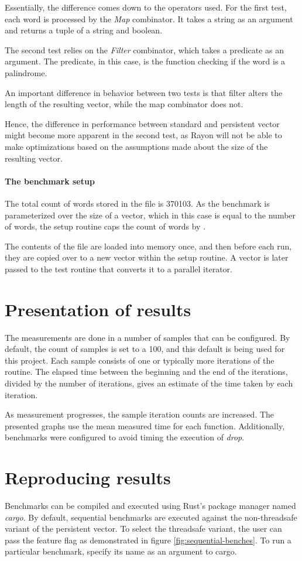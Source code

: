 Essentially, the difference comes down to the operators used. For the first test, each word is processed by the \emph{Map} combinator. It takes a string as an argument and returns a tuple of a string and boolean. 

The second test relies on the \emph{Filter} combinator, which takes a predicate as an argument. The predicate, in this case, is the function checking if the word is a palindrome. 

An important difference in behavior between two tests is that filter alters the length of the resulting vector, while the map combinator does not. 

Hence, the difference in performance between standard and persistent vector might become more apparent in the second test, as Rayon will not be able to make optimizations based on the assumptions made about the size of the resulting vector. 

\paragraph*{The benchmark setup}
The total count of words stored in the file is 370103. As the benchmark is parameterized over the size of a vector, which in this case is equal to the number of words, the setup routine caps the count of words by \n{}.

The contents of the file are loaded into memory once, and then before each run, they are copied over to a new vector within the setup routine. A vector is later passed to the test routine that converts it to a parallel iterator. 

\section{Presentation of results}
The measurements are done in a number of samples that can be configured. By default, the count of samples is set to a 100, and this default is being used for this project. Each sample consists of one or typically more iterations of the routine. The elapsed time between the beginning and the end of the iterations, divided by the number of iterations, gives an estimate of the time taken by each iteration. 

As measurement progresses, the sample iteration counts are increased. The presented graphs use the mean measured time for each function. Additionally, benchmarks were configured to avoid timing the execution of \emph{drop}. 

\section{Reproducing results}
Benchmarks can be compiled and executed using Rust's package manager named \emph{cargo}. By default, sequential benchmarks are executed against the non-threadsafe variant of the persistent vector. To select the threadsafe variant, the user can pass the \arc{} feature flag as demonstrated in figure \ref{fig:sequential-benches}. To run a particular benchmark, specify its name as an argument to cargo. 

